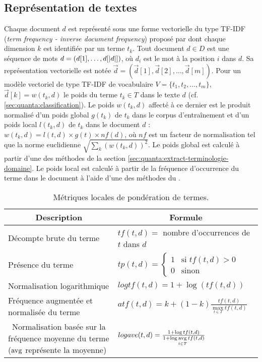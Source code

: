\subsection{Représentation de textes}
Chaque document $d$ est représenté sous une forme vectorielle du type TF-IDF (\textit{term frequency - inverse document frequency}) proposé par \cite{salton1988term-weighting} dont chaque dimension $k$ est identifiée par un terme $t_k$. Tout document $d \in D$ est une séquence de mots $d=(d[1], \dots, d[{\vert d\vert}])$, où $d_i$ est le mot à la position $i$ dans $d$. Sa représentation vectorielle est notée $\vec{d}=(\vec{d}[1], \vec{d}[2], \dots, \vec{d}[m])$. Pour un modèle vectoriel de type TF-IDF de vocabulaire $V = \lbrace t_1, t_2, \dots, t_m \rbrace$, $\vec{d}[k] = w(t_k,d)$ le poids du terme $t_k \in T$ dans le texte $d$ ({cf. \ref{sec:quanta:classification}}). Le poids $w(t_k, d)$ affecté à ce dernier est le produit normalisé d'un poids global $g(t_k)$ de $t_k$ dans le corpus d'entraînement et d'un poids local $l(t_k,d)$ de $t_k$ dans le document $d$ : $w(t_k, d) = l(t,d) \times g(t) \times nf(d)$, où $nf$ est un facteur de normalisation tel que la norme euclidienne $\sqrt{\sum\limits_k (w(t_k,d))^2}$. Le poids global est calculé à partir d'une des méthodes de la section \ref{sec:quanta:extract-terminologie-domaine}. Le poids local est calculé à partir de la fréquence d'occurrence du terme dans le document à l'aide d'une des méthodes du .

\begin{table}[!htb]
	\small\centering
	\begin{tabular}{p{}@{\hskip 0.2in}|p{}}
		\hline
		\multicolumn{1}{c|}{Description} & \multicolumn{1}{c}{Formule} \\
		\hline
		Décompte brute du terme \citep{salton1988term-weighting} & $tf(t,d) = $ nombre d'occurrences de $t$ dans $d$\\ \hline\noalign{\smallskip}
		Présence du terme \citep{salton1988term-weighting} & $tp(t,d) = \left\lbrace \begin{array}{cl}
		1 & \text{si } tf(t,d) > 0 \\
		0 & \text{sinon}
		\end{array} \right.$ \\ \hline
		Normalisation logarithmique & $logtf(t,d) = 1 + \log{\left(tf(t,d)\right)}$ \\ \hline
		Fréquence augmentée et normalisée du terme \citep{salton1988term-weighting}%
		& $atf(t,d) = k + (1-k) \frac{tf(t,d)}{\max\limits_{t \in T} tf(t,d)}$ \\ \hline\
		Normalisation basée sur la fréquence moyenne du terme \citep{manning2009irbook-weighting} ($\mathop{\mathrm{avg}}\limits $ représente la moyenne) & $logave(t,d) = \frac{1+\log {tf(t,d)}}{1 + \log \mathop{\mathrm{avg}}\limits\limits_{t \in T} tf(t, d) }$ \\ 
		\hline
	\end{tabular}
	
	\caption{Métriques locales de pondération de termes.} \label{tab:sensresultat:metriq_locales}
\end{table}

